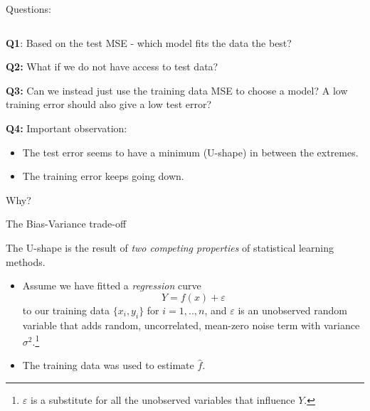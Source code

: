 \documentclass[ignorenonframetext,]{beamer}
\providecommand{\tightlist}{%
  \setlength{\itemsep}{0pt}\setlength{\parskip}{0pt}}
\begin{document}
\begin{frame}

\begin{block}{Questions:}

\(~\)

\textbf{Q1}: Based on the test MSE - which model fits the data the best?

\vspace{2mm}

\textbf{Q2:} What if we do not have access to test data?

\vspace{2mm}

\textbf{Q3:} Can we instead just use the training data MSE to choose a
model? A low training error should also give a low test error?

\vspace{2mm}

\textbf{Q4:} Important observation:

\vspace{2mm}

\begin{itemize}
\item
  The test error seems to have a minimum (U-shape) in between the
  extremes.
\item
  The training error keeps going down.
\end{itemize}

\centering
\vspace{2mm}

Why?

\end{block}

\end{frame}

\begin{frame}{The Bias-Variance trade-off}
\protect\hypertarget{the-bias-variance-trade-off}{}

\vspace{2mm}

The U-shape is the result of \emph{two competing properties} of
statistical learning methods.

\vspace{2mm}

\begin{itemize}
\tightlist
\item
  Assume we have fitted a \emph{regression} curve
  \[Y  = f(x) + \varepsilon\] to our training data \(\{x_i, y_i\}\) for
  \(i=1,..,n\), and \(\varepsilon\) is an unobserved random variable
  that adds random, uncorrelated, mean-zero noise term with variance
  \(\sigma^2\).\footnote{$\varepsilon$ is a substitute for all the unobserved variables that influence $Y$.}
\end{itemize}

\vspace{2mm}

\begin{itemize}
\tightlist
\item
  The training data was used to estimate \(\hat{f}\).
\end{itemize}

\end{frame}
\end{document}
